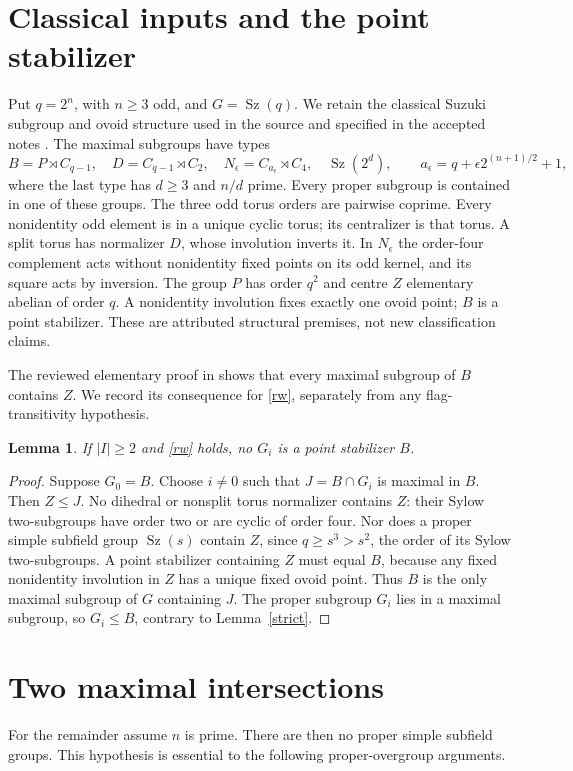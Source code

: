 \documentclass[11pt,a4paper]{article}
\newtheorem{lemma}{Lemma}
\newcommand{\Sz}{\operatorname{Sz}}
\begin{document}
\section{Classical inputs and the point stabilizer}
Put $q=2^n$, with $n\ge3$ odd, and $G=\Sz(q)$. We retain the
classical Suzuki subgroup and ovoid structure used in the source and
specified in the accepted notes \cite{preliminary,normalizers}.
The maximal subgroups have types
\[
 B=P\rtimes C_{q-1},\quad D=C_{q-1}\rtimes C_2,\quad
 N_\epsilon=C_{a_\epsilon}\rtimes C_4,\quad
 \Sz(2^d),
 \qquad a_\epsilon=q+\epsilon2^{(n+1)/2}+1,
\]
where the last type has $d\ge3$ and $n/d$ prime. Every proper
subgroup is contained in one of these groups. The three odd torus
orders are pairwise coprime. Every nonidentity odd element is in a
unique cyclic torus; its centralizer is that torus. A split torus has
normalizer $D$, whose involution inverts it. In $N_\epsilon$ the
order-four complement acts without nonidentity fixed points on its
odd kernel, and its square acts by inversion. The group $P$ has
order $q^2$ and centre $Z$ elementary abelian of order $q$. A nonidentity
involution fixes exactly one ovoid point; $B$ is a point stabilizer.
These are attributed structural premises, not new classification claims.

The reviewed elementary proof in \cite{preliminary} shows that every
maximal subgroup of $B$ contains $Z$. We record its consequence for
\eqref{rw}, separately from any flag-transitivity hypothesis.

\begin{lemma}\label{borel}
If $|I|\ge2$ and \eqref{rw} holds, no $G_i$ is a point stabilizer $B$.
\end{lemma}
\begin{proof}
Suppose $G_0=B$. Choose $i\ne0$ such that $J=B\cap G_i$ is
maximal in $B$. Then $Z\le J$. No dihedral or nonsplit torus
normalizer contains $Z$: their Sylow two-subgroups have order two
or are cyclic of order four. Nor does a proper simple subfield group
$\Sz(s)$ contain $Z$, since $q\ge s^3>s^2$, the order of its Sylow
two-subgroups. A point stabilizer containing $Z$ must equal $B$,
because any fixed nonidentity involution in $Z$ has a unique fixed
ovoid point. Thus $B$ is the only maximal subgroup of $G$ containing
$J$. The proper subgroup $G_i$ lies in a maximal subgroup, so $G_i\le B$,
contrary to Lemma~\ref{strict}.
\end{proof}

\section{Two maximal intersections}
For the remainder assume $n$ is prime. There are then no proper simple
subfield groups. This hypothesis is essential to the following
proper-overgroup arguments.
\end{document}

